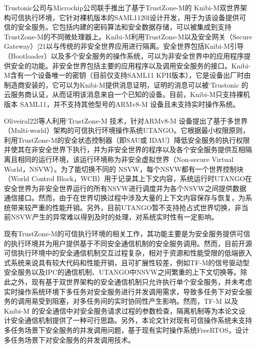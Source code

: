 \documentclass[12pt,a4paper]{ctexart}
\begin{document}
\par Trustonic公司与Microchip公司联手推出了基于TrustZone-M的 Knibi-M双世界架构可信执行环境，它针对裸机版本的SAML1120l设计开发，用于为该设备提供可信的安全服务。它包括内建的密码算法和安全数据存储，可以被集成到支持TrustZone-M的不同微处理器上。Knibi-M利用TrustZone-M以及安全网关（Secure Gateway）[21以与传统的非安全世界应用进行隔离。安全世界包括Knibi-M引导（Bootloader）以及多个安全服务的操作系统，可以为非安全世界中的应用程序提供安全的功能。非安全世界包括主要的应用程序以及调用安全服务的接口。Knibi-M含有一个设备唯一的密钥（目前仅支持SAML11 KPH版本），它是设备出厂时由制造商安装的，它可以为Knibi-M提供消息证明，证明的消息可以被‘Trustonic 的云服务商认证，从而证明该消息来自一个已知的设备。目前，Knibi-M只支持裸机版本 SAML11，并不支持其他型号的ARMv8-M 设备且未支持实时操作系统。

\par Oliveiral22l等人利用‘TrustZone-M 技术，针对ARMv8-M 设备提出了基于多世界（Multi-world）架构的可信执行环境操作系统UTANGO。它根据最小权限原则，利用TrustZone-M的安全状态控制器（即SAU或 IDAU）降低安全服务的执行权限并使其在非安全世界下执行，并为非安全世界的程序以及各个安全服务提供互相隔离且相同的运行环境，该运行环境称为非安全虚拟世界（Non-secure Virtual World，NSVW）。为了能切换不同的 NSVW，每个NSVW都有一个世界控制块（World Control Block，WCB）用于记录其上下文内容，系统运行时UTANGO在安全世界为非安全世界运行的所有NSVW进行调度并为各个NSVW之间提供数据通信接口。然而，由于在世界切换过程中涉及大量的上下文内容保存与恢复，为系统带来较严重的性能开销。另外，目前UTANGO暂不支持抢占式世界切换，非当前NSVW产生的异常难以得到及时的处理，对系统实时性有一定影响。
\par 现有TrustZone-M的可信执行环境的相关工作，其功能主要是为安全服务提供可信的执行环境并为用户提供基于不同安全通信机制的安全服务调用。然而，目前开源可信执行环境中的安全通信机制交互过程复杂，相对于资源和性能受限的低端嵌入式系统来说具有较大代码和性能开销，且可扩展性较差，例如TF-M的信号驱动型安全服务以及IPC的通信机制、UTANGO中NSVW之间繁重的上下文切换等。除此之外，现有基于双世界架构的安全通信机制只允许执行单个安全服务，并未考虑实时操作系统环境下多任务对安全服务进行并发调用需求，导致多任务下对安全服务的调用易受到阻塞，对多任务间的实时协同性产生影响。然而，TF-M 以及Knibi-M 的安全通信中对安全服务请求过程的参数检查，隔离机制等为本论文设计安全通信机制提供了一种可行思路。另外，本论文针对现有可信操作系统未支持多任务场景下安全服务的并发调用问题，基于现有实时操作系统FreeRTOS，设计多任务场景下对安全服务的并发调用技术。
\end{document}
